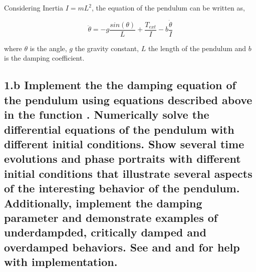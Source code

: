 \documentclass{cmc}
\begin{document}
Considering Inertia $I = mL^2$, the equation of the pendulum can be
written as,

\begin{equation}
  \label{eq:pendulum}
  \ddot{\theta} = -g\frac{sin(\theta)}{L} + \frac{T_{ext}}{I} - b \frac{\dot{\theta}}{I}
\end{equation}

where $\theta$ is the angle, $g$ the gravity constant, $L$ the length of the pendulum
and $b$ is the damping coefficient.








\subsection*{1.b Implement the the damping equation of the pendulum using equations described above in the function
  . Numerically solve the differential equations of the pendulum
  with different initial conditions.  Show several time evolutions and phase
  portraits with different initial conditions that illustrate several aspects of
  the interesting behavior of the pendulum. Additionally, implement the damping parameter and demonstrate examples of underdampded, critically damped and overdamped behaviors.
  See  and  and
   for help with implementation.}
\end{document}
